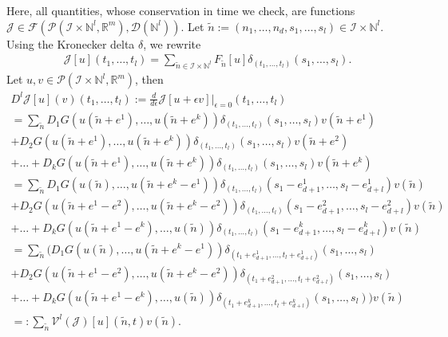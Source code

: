 \documentclass[runningheads]{llncs}
\newcommand{\Rr}{\mathbb{R}}
\newcommand{\Nn}{\mathbb{N}}
\newcommand{\1}{\chi}
\newcommand{\Ii}{\mathcal{I}}
\begin{document}
Here, all quantities, whose conservation in time we check, are functions $\mathcal{J}\in\mathcal{F}(\mathcal{P}(\Ii\times\Nn^l,\Rr^m),\mathcal{D}(\Nn^l))$. %
Let $\tilde{n}:=(n_1,\dots,n_d,s_1,\dots,s_l)\in\Ii\times\Nn^l$. Using the Kronecker delta $\delta$, we rewrite
\begin{gather*}
	\mathcal{J}[u](t_1,\ldots,t_{l})
	=\sum_{\tilde{n}\in\Ii\times\Nn^l}F_{\tilde{n}}[u]\delta_{(t_1,\ldots,t_{l})}(s_1,\ldots,s_l).
\end{gather*}
Let $u,v\in\mathcal{P}(\Ii\times\Nn^l,\Rr^m)$, then
\footnotesize
\begin{gather*}
	D^l\mathcal{J}[u](v)(t_1,\ldots,t_{l}):=\frac{d}{d\epsilon}\mathcal{J}[u+\epsilon v]\Big|_{\epsilon=0}(t_1,\ldots,t_{l})\\
	=\sum_{\tilde{n}}D_1G(u(\tilde{n}+e^1),\ldots,u(\tilde{n}+e^k))\delta_{(t_1,\ldots,t_{l})}(s_1,\ldots,s_l)v(\tilde{n}+e^1)\\
	+D_2G(u(\tilde{n}+e^1),\ldots,u(\tilde{n}+e^k))\delta_{(t_1,\ldots,t_{l})}(s_1,\ldots,s_l)v(\tilde{n}+e^2)\\+\ldots
	+D_kG(u(\tilde{n}+e^1),\ldots,u(\tilde{n}+e^k))\delta_{(t_1,\ldots,t_{l})}(s_1,\ldots,s_l)v(\tilde{n}+e^k)\\
	=\sum_{\tilde{n}}D_1G(u(\tilde{n}),\ldots,u(\tilde{n}+e^k-e^1))\delta_{(t_1,\ldots,t_{l})}(s_1-e^1_{d+1},\ldots,s_l-e^1_{d+l})v(\tilde{n})\\
	+D_2G(u(\tilde{n}+e^1-e^2),\ldots,u(\tilde{n}+e^k-e^2))\delta_{(t_1,\ldots,t_{l})}(s_1-e^2_{d+1},\ldots,s_l-e^2_{d+l})v(\tilde{n})\\+\ldots
	+D_kG(u(\tilde{n}+e^1-e^k),\ldots,u(\tilde{n}))\delta_{(t_1,\ldots,t_{l})}(s_1-e^k_{d+1},\ldots,s_l-e^k_{d+l})v(\tilde{n})\\
	=\sum_{\tilde{n}}\Big(D_1G(u(\tilde{n}),\ldots,u(\tilde{n}+e^k-e^1))\delta_{(t_1+e^1_{d+1},\ldots,t_{l}+e^1_{d+l})}(s_1,\ldots,s_l)\\
	+D_2G(u(\tilde{n}+e^1-e^2),\ldots,u(\tilde{n}+e^k-e^2))\delta_{(t_1+e^2_{d+1},\ldots,t_{l}+e^2_{d+l})}(s_1,\ldots,s_l)\\+\ldots
	+D_kG(u(\tilde{n}+e^1-e^k),\ldots,u(\tilde{n}))\delta_{(t_1+e^k_{d+1},\ldots,t_{l}+e^k_{d+l})}(s_1,\ldots,s_l)\Big)v(\tilde{n})\\
	=:\sum_{\tilde{n}}\mathcal{V}^l(\mathcal{J})[u](\tilde{n},t)v(\tilde{n}).
\end{gather*}
\end{document}
